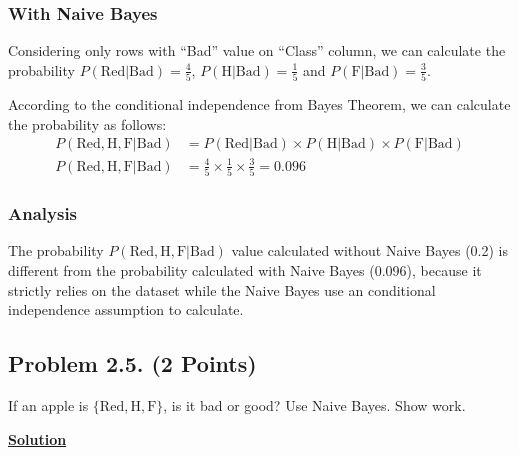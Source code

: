 \documentclass[12pt, a4paper]{article}
\begin{document}
            \subsubsection{With Naive Bayes}
                Considering only rows with \enquote{Bad} value on \enquote{Class} column, we can calculate the probability $P(\text{Red} | \text{Bad}) = \frac{4}{5}$,
                $P(\text{H} | \text{Bad}) = \frac{1}{5}$ and $P(\text{F} | \text{Bad}) = \frac{3}{5}$.

                According to the conditional independence from Bayes Theorem, we can calculate the probability as follows:
                \begin{align*}
                    P(\text{Red}, \text{H}, \text{F} | \text{Bad}) &= P(\text{Red} | \text{Bad}) \times P(\text{H} | \text{Bad}) \times P(\text{F} | \text{Bad}) \\[1em]
                    P(\text{Red}, \text{H}, \text{F} | \text{Bad}) &= \frac{4}{5} \times \frac{1}{5} \times \frac{3}{5} = 0.096
                \end{align*}

            \subsubsection{Analysis}
                The probability $P(\text{Red}, \text{H}, \text{F} | \text{Bad})$ value calculated without Naive Bayes (0.2) is different from the probability
                calculated with Naive Bayes (0.096), because it strictly relies on the dataset while the Naive Bayes use an conditional independence assumption to calculate.

    \pagebreak

        \subsection{Problem 2.5. (2 Points)}
            If an apple is $\{ \text{Red}, \text{H}, \text{F} \}$, is it bad or good? Use Naive Bayes. Show work.

            \vspace{1em}

            \noindent \underline{\textbf{Solution}}

            \vspace{0.5em}
\end{document}
